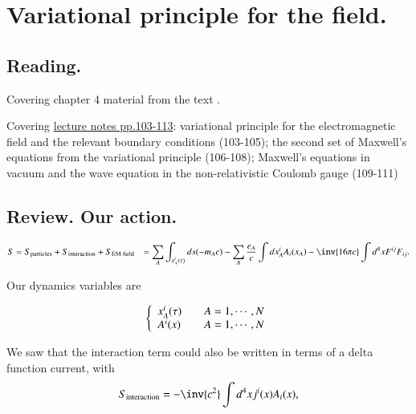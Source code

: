 %
%

\chapter{Variational principle for the field.}
\label{chap:relativisticElectrodynamicsL13}
{}
\date{Feb 15, 2011}

\beginArtNoToc

\section{Reading.}

Covering chapter 4 material from the text \cite{landau1980classical}.

Covering \href{http://www.physics.utoronto.ca/~poppitz/e-poppitz/PHY450_files/RelEMpp103-113.pdf}{lecture notes pp.103-113}: variational principle for the electromagnetic field and the relevant boundary conditions (103-105); the second set of Maxwell's equations from the variational principle (106-108); Maxwell's equations in vacuum and the wave equation in the non-relativistic Coulomb gauge (109-111)

\section{Review.  Our action.}

\begin{align*}
S
&= S_{\text{particles}} + S_{\text{interaction}} + S_{\text{EM field}}
&= \sum_A \int_{x_A^i(\tau)} ds ( -m_A c )
- \sum_A
\frac{e_A}{c}
\int dx_A^i A_i(x_A)
- \inv{16 \pi c} \int d^4 x F^{ij } F_{ij}.
\end{align*}

Our dynamics variables are

\begin{equation}\label{eqn:relativisticElectrodynamicsL13:30}
\left\{
\begin{array}{l l}
x_A^i(\tau) & \quad \mbox{$A = 1, \cdots, N$} \\
A^i(x) & \quad \mbox{$A = 1, \cdots, N$}
\end{array}
\right.
\end{equation}

We saw that the interaction term could also be written in terms of a delta function current, with
\begin{equation}\label{eqn:relativisticElectrodynamicsL13:50}
S_{\text{interaction}}
= -\inv{c^2} \int d^4x j^i(x) A_i(x),
\end{equation}

